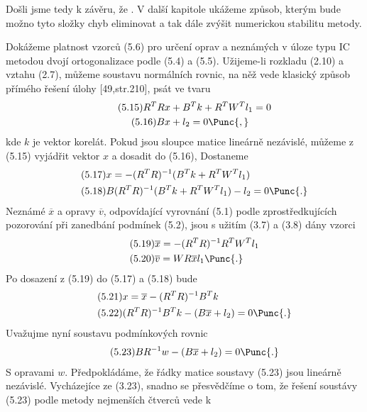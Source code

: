 Došli jsme tedy k závěru, že . V další kapitole ukážeme způsob, kterým bude možno
tyto složky chyb eliminovat a tak dále zvýšit numerickou stabilitu
metody.


 \label{XLVI} Dokážeme platnost vzorců (5.6) pro určení oprav
a neznámých v úloze typu IC metodou dvojí ortogonalizace podle
(5.4) a (5.5). Užijeme-li rozkladu (2.10) a vztahu (2.7),
můžeme soustavu normálních rovnic, na něž vede klasický způsob
přímého řešení úlohy [49,str.210], psát ve tvaru
%
\begin{align*}
\tag{5.15}      R^TRx& + B^Tk + R^TW^Tl_1 = 0\\
\tag{5.16}      Bx&           + l_2      = 0 \Punc{,}
\end{align*}
%
kde $k$ je vektor korelát. Pokud jsou sloupce matice \Amat{} lineárně
nezávislé, můžeme z (5.15) vyjádřit vektor $x$ a dosadit do (5.16),
Dostaneme
%
\begin{align*}
\tag{5.17}     &x = -(R^TR)^{-1}(B^Tk + R^TW^Tl_1)\\
\tag{5.18}     &B(R^TR)^{-1} (B^Tk + R^TW^Tl_1) - l_2 = 0 \Punc{.}
\end{align*}
%
Neznámé $\overline{x}$ a opravy $\overline{v}$, odpovídající vyrovnání
(5.1) podle zprostředkujících pozorování při zanedbání podmínek
(5.2), jsou s užitím (3.7) a (3.8) dány vzorci
%
\begin{align*}
\tag{5.19}      &\overline{x} = -(R^TR)^{-1}R^TW^Tl_1\\
\tag{5.20}      &\overline{v} = WR\overline{x}l_1 \Punc{.}
\end{align*}
%
Po dosazení  z (5.19) do (5.17) a (5.18) bude
\begin{align*}
\tag{5.21}     &x = \overline{x} - (R^TR)^{-1}B^Tk\\
\tag{5.22}     &(R^TR)^{-1}B^Tk - (B\overline{x} + l_2) = 0 \Punc{.}
\end{align*}
%
Uvažujme nyní soustavu podmínkových rovnic
%
\begin{align*}
\tag{5.23}     BR^{-1}w - (B\overline{x} + l_2) = 0 \Punc{.}
\end{align*}
%
S opravami $w$. Předpokládáme, že řádky matice soustavy (5.23) jsou
lineárně nezávislé. Vycházejíce ze (3.23), snadno se přesvědčíme o
tom, že řešení soustávy (5.23) podle metody nejmenších čtverců vede k
